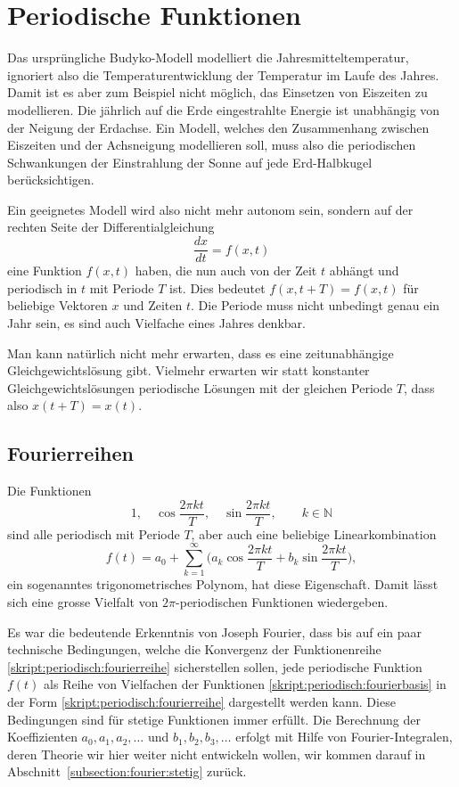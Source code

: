 %
%
%
\section{Periodische Funktionen}
Das ursprüngliche Budyko-Modell modelliert die Jahresmitteltemperatur,
ignoriert also die Temperaturentwicklung der Temperatur im Laufe des
Jahres.
Damit ist es aber zum Beispiel nicht möglich, das Einsetzen von
Eiszeiten zu modellieren.
Die jährlich
auf die Erde eingestrahlte Energie ist unabhängig von der Neigung der
Erdachse.
Ein Modell, welches den Zusammenhang zwischen Eiszeiten und der
Achsneigung modellieren soll, muss also die periodischen Schwankungen
der Einstrahlung der Sonne auf jede Erd-Halbkugel berücksichtigen.

Ein geeignetes Modell wird also nicht mehr autonom sein, sondern auf der
rechten Seite der Differentialgleichung
\[
\frac{dx}{dt} = f(x,t)
\]
eine Funktion $f(x,t)$ haben, die nun auch von der Zeit $t$ abhängt
und periodisch in $t$ mit Periode $T$ ist.
Dies bedeutet $f(x,t+T)=f(x,t)$ für beliebige Vektoren $x$ und 
Zeiten $t$.
Die Periode muss nicht unbedingt genau ein Jahr sein, es sind auch
Vielfache eines Jahres denkbar.

Man kann natürlich nicht mehr erwarten, dass es eine zeitunabhängige
Gleichgewichtslösung gibt.
Vielmehr erwarten wir statt konstanter Gleichgewichtslösungen 
periodische Lösungen mit der gleichen Periode $T$, dass also
$x(t+T)=x(t)$.

\subsection{Fourierreihen}
Die Funktionen
\begin{equation}
1,\quad
\cos \frac{2\pi kt}{T},\quad
\sin \frac{2\pi kt}{T},\qquad k\in \mathbb N
\label{skript:periodisch:fourierbasis}
\end{equation}
sind alle periodisch mit Periode $T$, aber auch eine beliebige
Linearkombination
\begin{equation}
f(t)
=
a_0  +\sum_{k=1}^\infty\biggl(
a_k \cos \frac{2\pi kt}{T} + b_k\sin\frac{2\pi kt}{T}
\biggr),
\label{skript:periodisch:fourierreihe}
\end{equation}
ein sogenanntes trigonometrisches Polynom, hat diese Eigenschaft.
Damit lässt sich eine grosse Vielfalt von $2\pi$-periodischen
Funktionen wiedergeben.

Es war die bedeutende Erkenntnis von Joseph Fourier, dass bis auf ein
%
paar technische Bedingungen, welche die Konvergenz der Funktionenreihe
\eqref{skript:periodisch:fourierreihe}
sicherstellen sollen, jede periodische Funktion $f(t)$ 
als Reihe von Vielfachen der Funktionen
\eqref{skript:periodisch:fourierbasis}
in der Form
\eqref{skript:periodisch:fourierreihe}
dargestellt werden kann.
Diese Bedingungen sind für stetige Funktionen immer erfüllt.
Die Berechnung der Koeffizienten $a_0,a_1,a_2,\dots$ und $b_1,b_2,b_3,\dots$
erfolgt mit Hilfe von Fourier-Integralen, deren Theorie wir hier weiter
nicht entwickeln wollen, wir kommen darauf in
Abschnitt~\ref{subsection:fourier:stetig} zurück.

